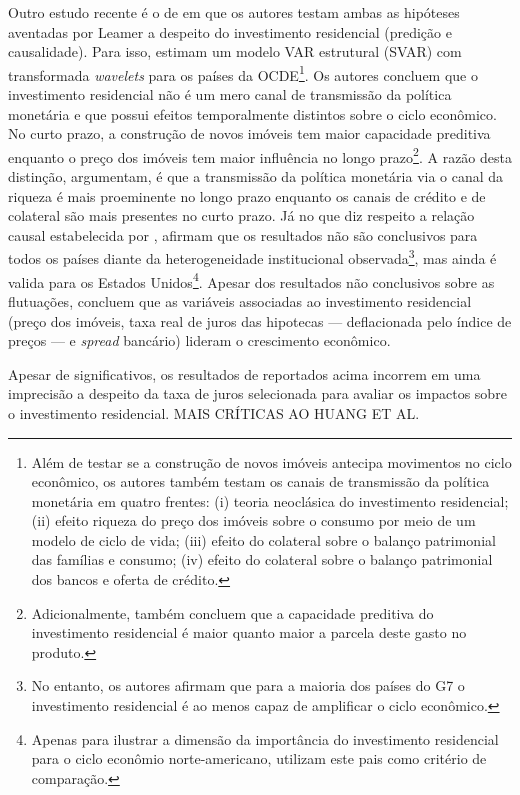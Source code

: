 Outro estudo recente é o de \textcite{huang_is_2018} em que os autores testam ambas as hipóteses aventadas por Leamer a despeito do investimento residencial (predição e causalidade). Para isso, estimam um modelo VAR estrutural (SVAR) com transformada \textit{wavelets} para os países da OCDE\footnote{
	Além de testar se a construção de novos imóveis antecipa movimentos no ciclo econômico, os autores também testam os canais de transmissão da política monetária em quatro frentes: (i) teoria neoclásica do investimento residencial; (ii) efeito riqueza do preço dos imóveis sobre o consumo por meio de um modelo de ciclo de vida; (iii) efeito do colateral sobre o balanço patrimonial das famílias e consumo; (iv) efeito do colateral sobre o balanço patrimonial dos bancos e oferta de crédito.}.  
Os autores concluem que o investimento residencial não é um mero canal de transmissão da política monetária e que possui efeitos temporalmente distintos sobre o ciclo econômico. No curto prazo, a construção de novos imóveis tem maior capacidade preditiva enquanto o preço dos imóveis tem maior influência no longo prazo\footnote{Adicionalmente, \textcite{huang_is_2018} também concluem que a capacidade preditiva do investimento residencial é maior quanto maior a parcela deste gasto no produto.}. A razão desta distinção, argumentam, é que a transmissão da política monetária via o canal da riqueza é mais proeminente no longo prazo enquanto os canais de crédito e de colateral são mais presentes no curto prazo. Já no que diz respeito a relação causal estabelecida por \textcite{leamer_housing_2007}, afirmam que os resultados não são conclusivos para todos os países diante da heterogeneidade institucional observada\footnote{
	No entanto, os autores afirmam que para a maioria dos países do G7 o investimento residencial é ao menos capaz de amplificar o ciclo econômico.}, mas ainda é valida para os Estados Unidos\footnote{
	Apenas para ilustrar a dimensão da importância do investimento residencial para o ciclo econômio norte-americano, \textcite{huang_is_2018} utilizam este pais como critério de comparação.}.
Apesar dos resultados não conclusivos sobre as flutuações, concluem que as variáveis associadas ao investimento residencial (preço dos imóveis, taxa real de juros das hipotecas --- deflacionada pelo índice de preços --- e \textit{spread} bancário) lideram o crescimento econômico.

Apesar de significativos, os resultados  de \textcite{huang_is_2018} reportados acima incorrem em uma imprecisão a despeito da taxa de juros selecionada para avaliar os impactos sobre o investimento residencial. 
MAIS CRÍTICAS AO HUANG ET AL.


